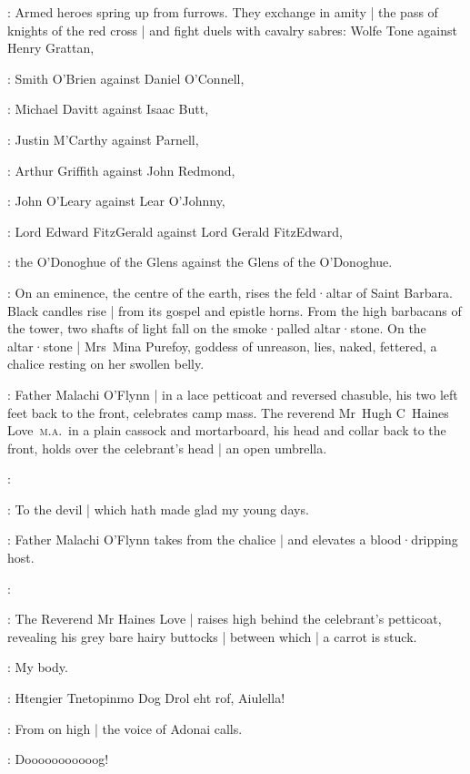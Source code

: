 :
Armed heroes spring up from furrows.
They exchange in amity |
the pass of knights of the red cross |
and fight duels with cavalry sabres:
Wolfe Tone against Henry Grattan,

:
Smith O'Brien against Daniel O'Connell,

:
Michael Davitt against Isaac Butt,

:
Justin M'Carthy against Parnell,

:
Arthur Griffith against John Redmond,

:
John O'Leary against Lear O'Johnny,

:
Lord Edward FitzGerald against Lord Gerald FitzEdward,

:
the O'Donoghue of the Glens against the Glens of the O'Donoghue.

:
On an eminence,
the centre of the earth,
rises the feld·altar of Saint Barbara.
Black candles rise |
from its gospel and epistle horns.
%
From the high barbacans of the tower,
two shafts of light fall on the smoke·palled altar·stone.
On the altar·stone |
Mrs~Mina Purefoy,
goddess of unreason,
lies,
naked,
fettered,
a chalice resting on her swollen belly.

:
Father Malachi O'Flynn |
in a lace petticoat and reversed chasuble,
his two left feet back to the front,
celebrates camp mass.
The reverend Mr~Hugh C~Haines Love~\textsc{m.a.}\ 
in a plain cassock and mortarboard,
his head and collar back to the front,
holds over the celebrant's head |
an open umbrella.

\FrMalachiOFlynn[7a]:

\HainesLove[7b]:
To the devil |
which hath made glad my young days.

:
Father Malachi O'Flynn takes from the chalice |
and elevates a blood·dripping host.

\FrMalachiOFlynn:

:
The Reverend Mr Haines Love |
raises high behind the celebrant's petticoat,
revealing his grey bare hairy buttocks |
between which |
a carrot is stuck.

\HainesLove:
My body.

\VoiceAllDamned[7b]:
Htengier Tnetopinmo Dog Drol eht rof,
Aiulella!

:
From on high |
the voice of Adonai calls.

\Adonai:
Dooooooooooog!

